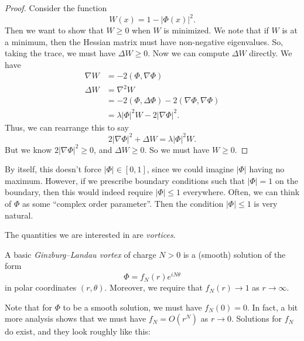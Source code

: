 \documentclass[a4paper]{article}
\begin{document}
\begin{proof}
  Consider the function
  \[
    W(x) = 1 - |\Phi(x)|^2.
  \]
  Then we want to show that $W \geq 0$ when $W$ is minimized. We note that if $W$ is at a minimum, then the Hessian matrix must have non-negative eigenvalues. So, taking the trace, we must have $\Delta W \geq 0$. Now we can compute $\Delta W$ directly. We have
  \begin{align*}
    \nabla W &= -2 (\Phi, \nabla \Phi)\\
    \Delta W &= \nabla^2 W \\
    &= - 2(\Phi, \Delta \Phi) - 2(\nabla \Phi, \nabla \Phi)\\
    &= \lambda |\Phi|^2 W - 2 |\nabla \Phi|^2.
  \end{align*}
  Thus, we can rearrange this to say
  \[
    2 |\nabla \Phi|^2 + \Delta W = \lambda |\Phi|^2 W.
  \]
  But we know $2 |\nabla \Phi|^2 \geq 0$, and $\Delta W \geq 0$. So we must have $W \geq 0$.
\end{proof}

By itself, this doesn't force $|\Phi| \in [0, 1]$, since we could imagine $|\Phi|$ having no maximum. However, if we prescribe boundary conditions such that $|\Phi| = 1$ on the boundary, then this would indeed require $|\Phi| \leq 1$ everywhere. Often, we can think of $\Phi$ as some ``complex order parameter''. Then the condition $|\Phi| \leq 1$ is very natural.

The quantities we are interested in are \emph{vortices}.

\begin{defi}
  A basic \emph{Ginzburg--Landau vortex} of charge $N > 0$ is a (smooth) solution of the form
  \[
    \Phi = f_N(r) e^{iN\theta}
  \]
  in polar coordinates $(r, \theta)$. Moreover, we require that $f_N(r) \to 1$ as $r \to \infty$.
\end{defi}
Note that for $\Phi$ to be a smooth solution, we must have $f_N(0) = 0$. In fact, a bit more analysis shows that we must have $f_N = O(r^N)$ as $r \to 0$. Solutions for $f_N$ do exist, and they look roughly like this:

\begin{center}
\end{center}
\end{document}

